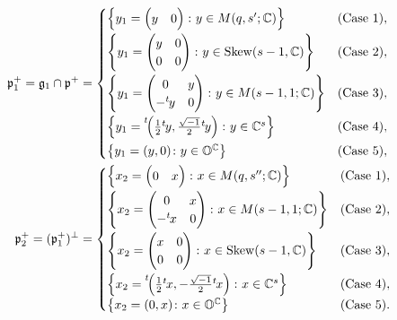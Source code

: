 \documentclass[pdftex]{sigma}
\numberwithin{equation}{section}
\newcommand{\BC}{\mathbb{C}}
\newcommand{\BO}{\mathbb{O}}
\newcommand{\fg}{\mathfrak{g}}
\newcommand{\fp}{\mathfrak{p}}
\newcommand{\Skew}{\operatorname{Skew}}
\begin{document}
\begin{align*}
\fp^+_1=\fg_1\cap\fp^+&=\begin{cases}
\left\{y_1=\begin{pmatrix}y&0\end{pmatrix}\colon y\in M(q,s';\BC)\right\}& (\text{Case }1),\vspace{1mm}\\
\left\{y_1=\begin{pmatrix}y&0\\0&0\end{pmatrix}\colon y\in \Skew(s-1,\BC)\right\}& (\text{Case }2),\vspace{1mm}\\
\left\{y_1=\begin{pmatrix}0&y\\-{}^t\hspace{-1pt}y&0\end{pmatrix}\colon y\in M(s-1,1;\BC)\right\}& (\text{Case }3),\vspace{1mm}\\
\left\{y_1={\vphantom{\bigl(}}^t\!\!\left(\frac{1}{2}{}^t\hspace{-1pt}y,\frac{\sqrt{-1}}{2}{}^t\hspace{-1pt}y\right)\colon
y\in \BC^s\right\}& (\text{Case }4),\vspace{1mm}\\
\left\{y_1=(y,0)\colon y\in\BO^\BC\right\}& (\text{Case }5), \end{cases}\\
\fp^+_2=(\fp^+_1)^\bot&=\begin{cases}
\left\{x_2=\begin{pmatrix}0&x\end{pmatrix}\colon x\in M(q,s'';\BC)\right\}& (\text{Case }1),\vspace{1mm}\\
\left\{x_2=\begin{pmatrix}0&x\\-{}^t\hspace{-1pt}x&0\end{pmatrix}\colon x\in M(s-1,1;\BC)\right\}& (\text{Case }2),\vspace{1mm}\\
\left\{x_2=\begin{pmatrix}x&0\\0&0\end{pmatrix}\colon x\in \Skew(s-1,\BC)\right\}& (\text{Case }3),\vspace{1mm}\\
\left\{x_2={\vphantom{\bigl(}}^t\!\!\left(\frac{1}{2}{}^t\hspace{-1pt}x,-\frac{\sqrt{-1}}{2}{}^t\hspace{-1pt}x\right)\colon
x\in \BC^s\right\}& (\text{Case }4),\\
\left\{x_2=(0,x)\colon x\in\BO^\BC\right\}& (\text{Case }5). \end{cases}
\end{align*}
\end{document}
